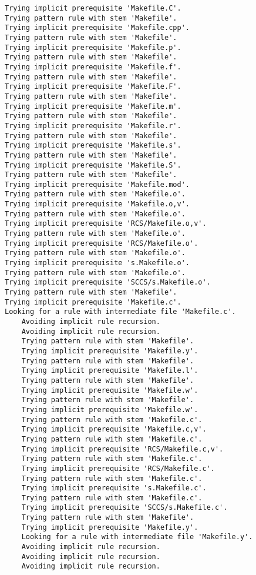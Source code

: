 \documentclass[11pt]{article}
\begin{document}
\begin{enumerate}
\begin{enumerate}
\begin{verbatim}
Trying implicit prerequisite 'Makefile.C'.
Trying pattern rule with stem 'Makefile'.
Trying implicit prerequisite 'Makefile.cpp'.
Trying pattern rule with stem 'Makefile'.
Trying implicit prerequisite 'Makefile.p'.
Trying pattern rule with stem 'Makefile'.
Trying implicit prerequisite 'Makefile.f'.
Trying pattern rule with stem 'Makefile'.
Trying implicit prerequisite 'Makefile.F'.
Trying pattern rule with stem 'Makefile'.
Trying implicit prerequisite 'Makefile.m'.
Trying pattern rule with stem 'Makefile'.
Trying implicit prerequisite 'Makefile.r'.
Trying pattern rule with stem 'Makefile'.
Trying implicit prerequisite 'Makefile.s'.
Trying pattern rule with stem 'Makefile'.
Trying implicit prerequisite 'Makefile.S'.
Trying pattern rule with stem 'Makefile'.
Trying implicit prerequisite 'Makefile.mod'.
Trying pattern rule with stem 'Makefile.o'.
Trying implicit prerequisite 'Makefile.o,v'.
Trying pattern rule with stem 'Makefile.o'.
Trying implicit prerequisite 'RCS/Makefile.o,v'.
Trying pattern rule with stem 'Makefile.o'.
Trying implicit prerequisite 'RCS/Makefile.o'.
Trying pattern rule with stem 'Makefile.o'.
Trying implicit prerequisite 's.Makefile.o'.
Trying pattern rule with stem 'Makefile.o'.
Trying implicit prerequisite 'SCCS/s.Makefile.o'.
Trying pattern rule with stem 'Makefile'.
Trying implicit prerequisite 'Makefile.c'.
Looking for a rule with intermediate file 'Makefile.c'.
    Avoiding implicit rule recursion.
    Avoiding implicit rule recursion.
    Trying pattern rule with stem 'Makefile'.
    Trying implicit prerequisite 'Makefile.y'.
    Trying pattern rule with stem 'Makefile'.
    Trying implicit prerequisite 'Makefile.l'.
    Trying pattern rule with stem 'Makefile'.
    Trying implicit prerequisite 'Makefile.w'.
    Trying pattern rule with stem 'Makefile'.
    Trying implicit prerequisite 'Makefile.w'.
    Trying pattern rule with stem 'Makefile.c'.
    Trying implicit prerequisite 'Makefile.c,v'.
    Trying pattern rule with stem 'Makefile.c'.
    Trying implicit prerequisite 'RCS/Makefile.c,v'.
    Trying pattern rule with stem 'Makefile.c'.
    Trying implicit prerequisite 'RCS/Makefile.c'.
    Trying pattern rule with stem 'Makefile.c'.
    Trying implicit prerequisite 's.Makefile.c'.
    Trying pattern rule with stem 'Makefile.c'.
    Trying implicit prerequisite 'SCCS/s.Makefile.c'.
    Trying pattern rule with stem 'Makefile'.
    Trying implicit prerequisite 'Makefile.y'.
    Looking for a rule with intermediate file 'Makefile.y'.
    Avoiding implicit rule recursion.
    Avoiding implicit rule recursion.
    Avoiding implicit rule recursion.

\end{verbatim}
\end{enumerate}
\end{enumerate}
\end{document}
